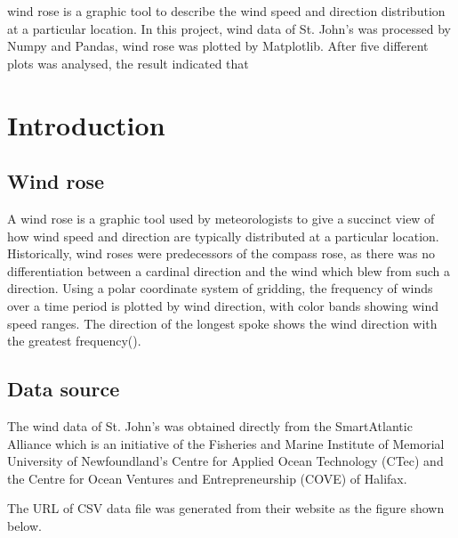 \documentclass[10pt]{report}
\begin{document}
wind rose is a graphic tool to describe the wind speed and direction distribution at a particular location. In this project, wind data of St. John's was processed by Numpy and Pandas, wind rose was plotted by Matplotlib. After five different plots was analysed, the result indicated that


\singlespacing          %
\listoffigures          %


 \tableofcontents


 \chapter{Introduction}     %
 
 \section{Wind rose}

A wind rose is a graphic tool used by meteorologists to give a succinct view of how wind speed and direction are typically distributed at a particular location. Historically, wind roses were predecessors of the compass rose, as there was no differentiation between a cardinal direction and the wind which blew from such a direction. Using a polar coordinate system of gridding, the frequency of winds over a time period is plotted by wind direction, with color bands showing wind speed ranges. The direction of the longest spoke shows the wind direction with the greatest frequency(\cite{wikipedia}). \par


\section{Data source}
The wind data of St. John's was obtained directly from the SmartAtlantic Alliance which is an initiative of the Fisheries and Marine Institute of Memorial University of Newfoundland's Centre for Applied Ocean Technology (CTec) and the Centre for Ocean Ventures and Entrepreneurship (COVE) of Halifax.\par
The URL of CSV data file was generated from their website as the figure shown below.\par
\end{document}
